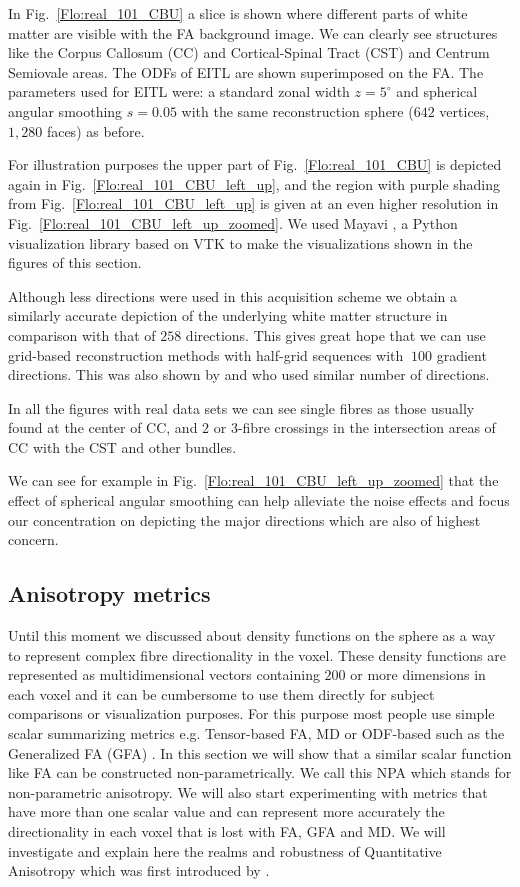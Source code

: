 \documentclass{bioinfo}
\begin{document}
In Fig.~\ref{Flo:real_101_CBU} a slice is shown where different
parts of white matter are visible with the FA background image. We
can clearly see structures like the Corpus Callosum (CC) and Cortical-Spinal
Tract (CST) and Centrum Semiovale areas. The ODFs of EITL are shown
superimposed on the FA. The parameters used for EITL were: a standard
zonal width $z=5^{\circ}$ and spherical angular smoothing $s=0.05$
with the same reconstruction sphere ($642$ vertices, $1,280$ faces)
as before.

For illustration purposes the upper part of Fig.~\ref{Flo:real_101_CBU}
is depicted again in Fig.~\ref{Flo:real_101_CBU_left_up}, and the
region with purple shading from Fig.~\ref{Flo:real_101_CBU_left_up}
is given at an even higher resolution in Fig.~\ref{Flo:real_101_CBU_left_up_zoomed}.
We used Mayavi \citep{ramachandran2011mayavi}, a Python visualization
library based on VTK to make the visualizations shown in the figures
of this section.

Although less directions were used in this acquisition scheme we obtain
a similarly accurate depiction of the underlying white matter structure
in comparison with that of $258$ directions. This gives great hope
that we can use grid-based reconstruction methods with half-grid sequences
with $~100$ gradient directions. This was also shown by \citet{Kuo}
and \citet{Yeh2010} who used similar number of directions. 

In all the figures with real data sets we can see single fibres as
those usually found at the center of CC, and $2$ or $3$-fibre crossings
in the intersection areas of CC with the CST and other bundles. 

We can see for example in Fig.~\ref{Flo:real_101_CBU_left_up_zoomed}
that the effect of spherical angular smoothing can help alleviate
the noise effects and focus our concentration on depicting the major
directions which are also of highest concern. 


\subsection{Anisotropy metrics}

Until this moment we discussed about density functions on the sphere
as a way to represent complex fibre directionality in the voxel. These
density functions are represented as multidimensional vectors containing
$200$ or more dimensions in each voxel and it can be cumbersome to
use them directly for subject comparisons or visualization purposes.
For this purpose most people use simple scalar summarizing metrics
e.g. Tensor-based FA, MD or ODF-based such as the Generalized FA (GFA)
\citep{Tuch2002}. In this section we will show that a similar scalar
function like FA can be constructed non-parametrically. We call this
NPA which stands for non-parametric anisotropy. We will also start
experimenting with metrics that have more than one scalar value and
can represent more accurately the directionality in each voxel that
is lost with FA, GFA and MD. We will investigate and explain here
the realms and robustness of Quantitative Anisotropy which was first
introduced by \citet{Yeh2010}.
\end{document}
